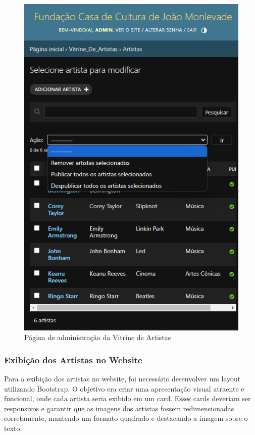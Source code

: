 \begin{figure}[htb]
	\caption{\label{fig_grafico}Página de administração da Vitrine de Artistas}
	\begin{center}
	    \includegraphics[scale=0.45]{./img/admin_artista.png}
	\end{center}
\end{figure}

\subsubsection{Exibição dos Artistas no Website}

Para a exibição dos artistas no website, foi necessário desenvolver um layout utilizando Bootstrap. O objetivo era criar uma apresentação visual atraente e funcional, onde cada artista seria exibido em um card. Esses cards deveriam ser responsivos e garantir que as imagens dos artistas fossem redimensionadas corretamente, mantendo um formato quadrado e destacando a imagem sobre o texto.

